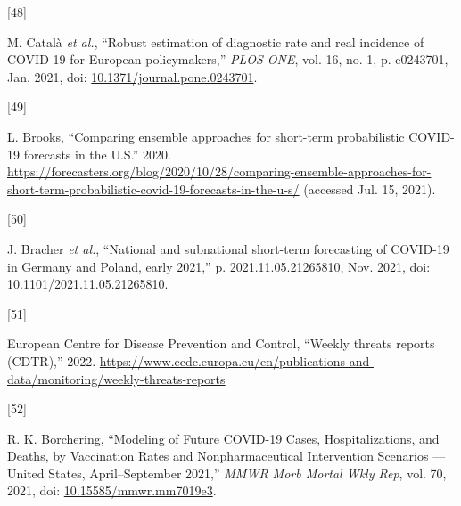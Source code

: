 \documentclass[
]{article}
\newlength{\cslhangindent}
\newlength{\csllabelwidth}
\newlength{\cslentryspacingunit} %
\newenvironment{CSLReferences}[2] %
 {%
  \setlength{\parindent}{0pt}
  \ifodd #1
  \let\oldpar\par
  \def\par{\hangindent=\cslhangindent\oldpar}
  \fi
  \setlength{\parskip}{#2\cslentryspacingunit}
 }%
 {}
\newcommand{\CSLLeftMargin}[1]{\parbox[t]{\csllabelwidth}{#1}}
\newcommand{\CSLRightInline}[1]{\parbox[t]{\linewidth - \csllabelwidth}{#1}\break}
\begin{document}
\begin{CSLReferences}{0}{0}
\leavevmode{}%
\CSLLeftMargin{{[}48{]} }
\CSLRightInline{M. Català \emph{et al.}, {``Robust estimation of diagnostic rate and real incidence of {COVID-19} for {European} policymakers,''} \emph{PLOS ONE}, vol. 16, no. 1, p. e0243701, Jan. 2021, doi: \href{https://doi.org/10.1371/journal.pone.0243701}{10.1371/journal.pone.0243701}.}

\leavevmode{}%
\CSLLeftMargin{{[}49{]} }
\CSLRightInline{L. Brooks, {``Comparing ensemble approaches for short-term probabilistic {COVID-19} forecasts in the {U}.{S}.''} 2020. \url{https://forecasters.org/blog/2020/10/28/comparing-ensemble-approaches-for-short-term-probabilistic-covid-19-forecasts-in-the-u-s/} (accessed Jul. 15, 2021).}

\leavevmode{}%
\CSLLeftMargin{{[}50{]} }
\CSLRightInline{J. Bracher \emph{et al.}, {``National and subnational short-term forecasting of {COVID-19} in {Germany} and {Poland}, early 2021,''} p. 2021.11.05.21265810, Nov. 2021, doi: \href{https://doi.org/10.1101/2021.11.05.21265810}{10.1101/2021.11.05.21265810}.}

\leavevmode{}%
\CSLLeftMargin{{[}51{]} }
\CSLRightInline{European Centre for Disease Prevention and Control, {``Weekly threats reports ({CDTR}),''} 2022. \url{https://www.ecdc.europa.eu/en/publications-and-data/monitoring/weekly-threats-reports}}

\leavevmode{}%
\CSLLeftMargin{{[}52{]} }
\CSLRightInline{R. K. Borchering, {``Modeling of {Future COVID-19 Cases}, {Hospitalizations}, and {Deaths}, by {Vaccination Rates} and {Nonpharmaceutical Intervention Scenarios} --- {United States}, {April}--{September} 2021,''} \emph{MMWR Morb Mortal Wkly Rep}, vol. 70, 2021, doi: \href{https://doi.org/10.15585/mmwr.mm7019e3}{10.15585/mmwr.mm7019e3}.}

\end{CSLReferences}

\newpage
\end{document}
